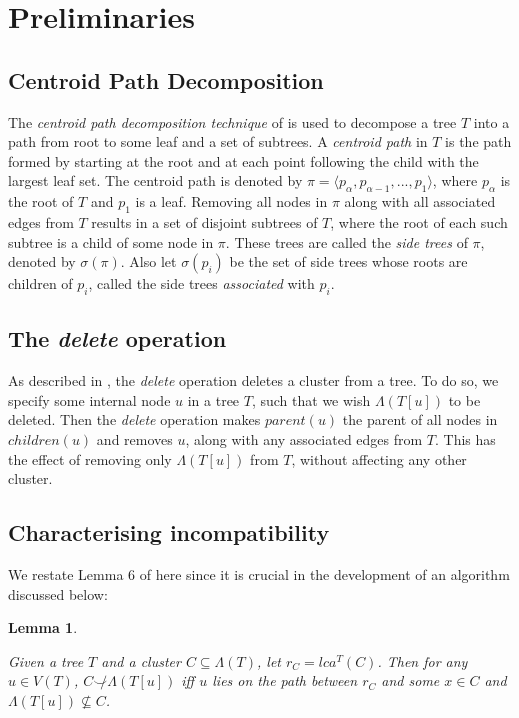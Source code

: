 \documentclass{article}
\newcommand{\compatible}{\smile}
\newcommand{\leafset}{\Lambda}
\newtheorem{incompatibility}{Lemma}
\begin{document}
    \section{Preliminaries}
    \label{sec:preliminaries}

    \subsection{Centroid Path Decomposition}

    The \textit{centroid path decomposition technique} of \cite{cole2000n} is used to decompose a tree $T$ into a path from root to some leaf and a set of subtrees. A \textit{centroid path} in $T$ is the path formed by starting at the root and at each point following the child with the largest leaf set. The centroid path is denoted by $\pi = \langle p_{\alpha}, p_{\alpha - 1}, ..., p_1 \rangle$, where $p_{\alpha}$ is the root of $T$ and $p_1$ is a leaf. Removing all nodes in $\pi$ along with all associated edges from $T$ results in a set of disjoint subtrees of $T$, where the root of each such subtree is a child of some node in $\pi$. These trees are called the \textit{side trees} of $\pi$, denoted by $\sigma(\pi)$. Also let $\sigma(p_i)$ be the set of side trees whose roots are children of $p_i$, called the side trees \textit{associated} with $p_i$.

    \subsection{The \textit{delete} operation}
    As described in \cite{jansson2018algorithms}, the \textit{delete} operation deletes a cluster from a tree. To do so, we specify some internal node $u$ in a tree $T$, such that we wish $\leafset(T[u])$ to be deleted. Then the \textit{delete} operation makes $parent(u)$ the parent of all nodes in $children(u)$ and removes $u$, along with any associated edges from $T$. This has the effect of removing only $\leafset(T[u])$ from $T$, without affecting any other cluster.

    \subsection{Characterising incompatibility}
    We restate Lemma 6 of \cite{jansson2018algorithms} here since it is crucial in the development of an algorithm discussed below:
    \newline

    \begin{incompatibility}
        \label{lem:incompatibility}

        Given a tree $T$ and a cluster $C \subseteq \leafset(T)$, let $r_C = lca^T(C)$. Then for any $u \in V(T)$, $C \not\compatible \leafset(T[u])$ iff $u$ lies on the path between $r_C$ and some $x \in C$ and $\leafset(T[u]) \not\subseteq C$.
    \end{incompatibility}
\end{document}
